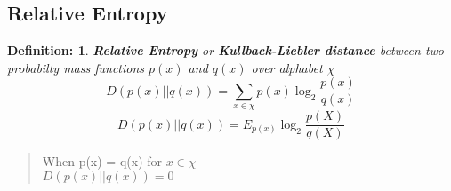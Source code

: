 \documentclass[11pt]{article}
\newtheorem{defn}{Definition:}
\begin{document}
\subsection{Relative Entropy}
\begin{defn}
\textbf{Relative Entropy} or \textbf{Kullback-Liebler distance} between two probabilty mass functions $p(x)$ and $q(x)$ over alphabet $\chi$
\begin{equation}
D(p(x)||q(x))=\sum \limits_{x \in \chi} p(x) \log_{2}\frac{p(x)}{q(x)}
\end{equation}
\begin{equation}
D(p(x)||q(x))=E_{p(x)}\log_{2} \frac{p(X)}{q(X)}
\end{equation}

\end{defn}

\begin{verse}
When p(x) = q(x) for $ x \in \chi $\\
$D(p(x)||q(x))=0$
\end{verse}
\end{document}
